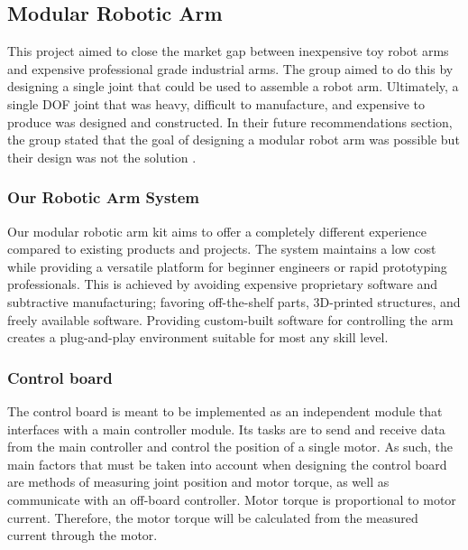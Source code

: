 \subsection{Modular Robotic Arm}
This project aimed to close the market gap between inexpensive toy robot arms and expensive professional grade industrial arms. The group aimed to do this by designing a single joint that could be used to assemble a robot arm. Ultimately, a single DOF joint that was heavy, difficult to manufacture, and expensive to produce was designed and constructed. In their future recommendations section, the group stated that the goal of designing a modular robot arm was possible but their design was not the solution \cite{MRA}.

\subsubsection{Our Robotic Arm System}
Our modular robotic arm kit aims to offer a completely different experience compared to existing products and projects. The system maintains a low cost while providing a versatile platform for beginner engineers or rapid prototyping professionals. This is achieved by avoiding expensive proprietary software and subtractive manufacturing; favoring off-the-shelf parts, 3D-printed structures, and freely available software. Providing custom-built software for controlling the arm creates a plug-and-play environment suitable for most any skill level.


\subsubsection{Control board}
The control board is meant to be implemented as an independent module that interfaces with a main controller module. Its tasks are to send and receive data from the main controller and control the position of a single motor. As such, the main factors that must be taken into account when designing the control board are methods of measuring joint position and motor torque, as well as communicate with an off-board controller. Motor torque is proportional to motor current. Therefore, the motor torque will be calculated from the measured current through the motor.

